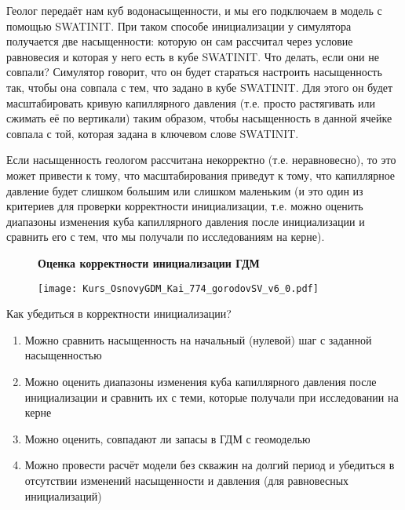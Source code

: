 Геолог передаёт нам куб водонасыщенности, и мы его подключаем в модель с помощью SWATINIT.
При таком способе инициализации у симулятора получается две насыщенности: которую он сам рассчитал через условие равновесия и которая у него есть в кубе SWATINIT.
Что делать, если они не совпали?
Симулятор говорит, что он будет стараться настроить насыщенность так, чтобы она совпала с тем, что задано в кубе SWATINIT.
Для этого он будет масштабировать кривую капиллярного давления (т.е. просто растягивать или сжимать её по вертикали) таким образом, чтобы насыщенность в данной ячейке совпала с той, которая задана в ключевом слове SWATINIT.

Если насыщенность геологом рассчитана некорректно (т.е. неравновесно), то это может привести к тому, что масштабирования приведут к тому, что капиллярное давление будет слишком большим или слишком маленьким (и это один из критериев для проверки корректности инициализации, т.е. можно оценить диапазоны изменения куба капиллярного давления после инициализации и сравнить его с тем, что мы получали по исследованиям на керне).
\\

\begin{figure}[H]
\textbf{Оценка корректности инициализации ГДМ}

\texttt{[image: Kurs\_OsnovyGDM\_Kai\_774\_gorodovSV\_v6\_0.pdf]}
\end{figure}

Как убедиться в корректности инициализации?

\begin{enumerate}
	\item Можно сравнить насыщенность на начальный (нулевой) шаг с заданной насыщенностью
	\item Можно оценить диапазоны изменения куба капиллярного давления после инициализации и сравнить их с теми, которые получали при исследовании на керне
	\item Можно оценить, совпадают ли запасы в ГДМ с геомоделью
	\item Можно провести расчёт модели без скважин на долгий период и убедиться в отсутствии изменений насыщенности и давления (для равновесных инициализаций)
\end{enumerate}


